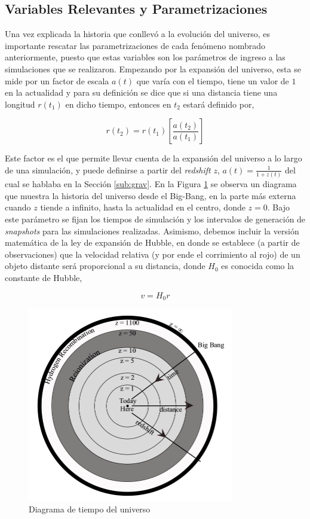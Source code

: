 \subsection{Variables Relevantes y Parametrizaciones} 
Una vez explicada la historia que conllevó a la evolución del universo, es importante rescatar las parametrizaciones de cada fenómeno nombrado anteriormente, puesto que estas variables son los parámetros de ingreso a las simulaciones que se realizaron. Empezando por la expansión del universo, esta se mide por un factor de escala $a(t)$ que varía con el tiempo, tiene un valor de $1$ en la actualidad y para su definición se dice que si una distancia tiene una longitud $r(t_1)$ en dicho tiempo, entonces en $t_2$ estará definido por,

\begin{equation}
r(t_2)=r(t_1)\left[\frac{a(t_2)}{a(t_1)}\right]
\label{eq:at}
\end{equation}

Este factor es el que permite llevar cuenta de la expansión del universo a lo largo de una simulación, y puede definirse a partir del \textit{redshift} $z$, $a(t)=\frac{1}{1+z(t)}$ del cual se hablaba en la Sección \ref{sub:grav}. En la Figura \ref{fig:red} se observa un diagrama que muestra la historia del universo desde el Big-Bang, en la parte más externa cuando $z$ tiende a infinito, hasta la actualidad en el centro, donde $z=0$. Bajo este parámetro se fijan los tiempos de simulación y los intervalos de generación de \textit{snapshots} para las simulaciones realizadas. Asimismo, debemos incluir la versión matemática de la ley de expansión de Hubble, en donde se establece (a partir de observaciones) que la velocidad relativa (y por ende el corrimiento al rojo) de un objeto distante será proporcional a su distancia, donde $H_0$ es conocida como la constante de Hubble,

\begin{equation}
v=H_0r
\label{eq:hub}
\end{equation}

\begin{figure}[H]
	\centering
	\includegraphics[width=9cm]{MarcoTeorico/historia}
	\caption[Diagrama de tiempo del universo]{Diagrama de tiempo del universo\footnotemark}
	\label{fig:red}
\end{figure}

